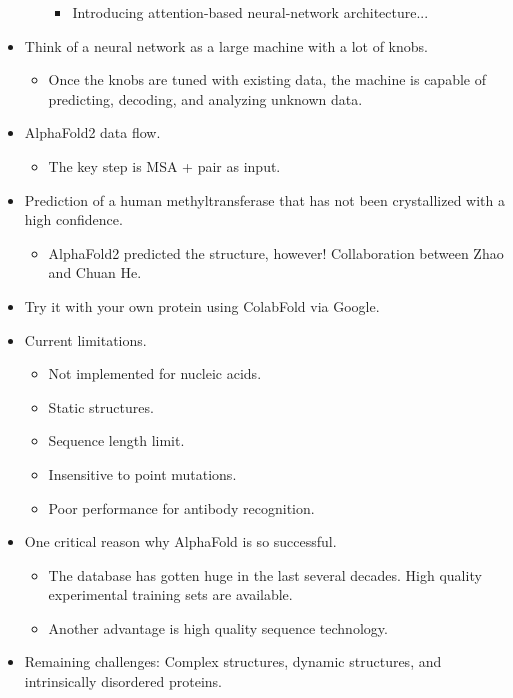 \documentclass[../notes.tex]{subfiles}
\begin{document}
\begin{itemize}
\begin{itemize}
\begin{itemize}
            \item Introducing attention-based neural-network architecture...
        \end{itemize}
    \end{itemize}
    \item Think of a neural network as a large machine with a lot of knobs.
    \begin{itemize}
        \item Once the knobs are tuned with existing data, the machine is capable of predicting, decoding, and analyzing unknown data.
    \end{itemize}
    \item AlphaFold2 data flow.
    \begin{itemize}
        \item The key step is MSA + pair as input.
    \end{itemize}
    \item Prediction of a human methyltransferase that has not been crystallized with a high confidence.
    \begin{itemize}
        \item AlphaFold2 predicted the structure, however! Collaboration between Zhao and Chuan He.
    \end{itemize}
    \item Try it with your own protein using ColabFold via Google.
    \item Current limitations.
    \begin{itemize}
        \item Not implemented for nucleic acids.
        \item Static structures.
        \item Sequence length limit.
        \item Insensitive to point mutations.
        \item Poor performance for antibody recognition.
    \end{itemize}
    \item One critical reason why AlphaFold is so successful.
    \begin{itemize}
        \item The database has gotten huge in the last several decades. High quality experimental training sets are available.
        \item Another advantage is high quality sequence technology.
    \end{itemize}
    \item Remaining challenges: Complex structures, dynamic structures, and intrinsically disordered proteins.

\end{itemize}
\end{document}
